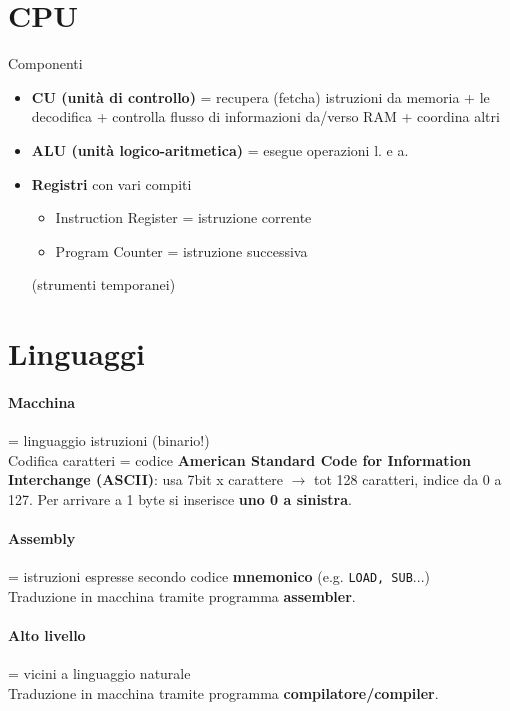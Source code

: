 \documentclass[10pt, oneside]{book}
\begin{document}
\section{CPU}
Componenti
\begin{itemize}
\item \textbf{CU (unità di controllo)} = recupera (fetcha) istruzioni da memoria + le decodifica + controlla flusso di informazioni da/verso RAM + coordina altri
\item \textbf{ALU (unità logico-aritmetica)} = esegue operazioni l. e a.
\item \textbf{Registri} con vari compiti
\begin{itemize}
\item Instruction Register = istruzione corrente
\item Program Counter = istruzione successiva
\end{itemize}
(strumenti temporanei)
\end{itemize}

\section{Linguaggi}
\paragraph{Macchina} = linguaggio istruzioni (binario!)\\
Codifica caratteri = codice \textbf{American Standard Code for Information Interchange (ASCII)}: usa 7bit x carattere $\rightarrow$ tot 128 caratteri, indice da 0 a 127. Per arrivare a 1 byte si inserisce \textbf{uno 0 a sinistra}.
\paragraph{Assembly} = istruzioni espresse secondo codice \textbf{mnemonico} (e.g. \texttt{LOAD, SUB}...)\\
Traduzione in macchina tramite programma \textbf{assembler}.
\paragraph{Alto livello} = vicini a linguaggio naturale\\
Traduzione in macchina tramite programma \textbf{compilatore/compiler}.
\end{document}
